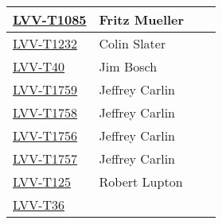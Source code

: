 \documentclass[DM,lsstdraft,STR,toc]{lsstdoc}
\begin{document}
{\begin{longtable}{p{3cm}p{3cm}p{3cm}p{6cm}}
\href{https://jira.lsstcorp.org/secure/Tests.jspa#/testCase/LVV-T1085}{LVV-T1085}
& {\small Fritz Mueller } & {\small  } &
\begin{minipage}[]{6cm}
\smallskip
{\small  }
\medskip
\end{minipage}
\\ \hline
\href{https://jira.lsstcorp.org/secure/Tests.jspa#/testCase/LVV-T1232}{LVV-T1232}
& {\small Colin Slater } & {\small  } &
\begin{minipage}[]{6cm}
\smallskip
{\small  }
\medskip
\end{minipage}
\\ \hline
\href{https://jira.lsstcorp.org/secure/Tests.jspa#/testCase/LVV-T40}{LVV-T40}
& {\small Jim Bosch } & {\small  } &
\begin{minipage}[]{6cm}
\smallskip
{\small  }
\medskip
\end{minipage}
\\ \hline
\href{https://jira.lsstcorp.org/secure/Tests.jspa#/testCase/LVV-T1759}{LVV-T1759}
& {\small Jeffrey Carlin } & {\small  } &
\begin{minipage}[]{6cm}
\smallskip
{\small  }
\medskip
\end{minipage}
\\ \hline
\href{https://jira.lsstcorp.org/secure/Tests.jspa#/testCase/LVV-T1758}{LVV-T1758}
& {\small Jeffrey Carlin } & {\small  } &
\begin{minipage}[]{6cm}
\smallskip
{\small  }
\medskip
\end{minipage}
\\ \hline
\href{https://jira.lsstcorp.org/secure/Tests.jspa#/testCase/LVV-T1756}{LVV-T1756}
& {\small Jeffrey Carlin } & {\small  } &
\begin{minipage}[]{6cm}
\smallskip
{\small  }
\medskip
\end{minipage}
\\ \hline
\href{https://jira.lsstcorp.org/secure/Tests.jspa#/testCase/LVV-T1757}{LVV-T1757}
& {\small Jeffrey Carlin } & {\small  } &
\begin{minipage}[]{6cm}
\smallskip
{\small  }
\medskip
\end{minipage}
\\ \hline
\href{https://jira.lsstcorp.org/secure/Tests.jspa#/testCase/LVV-T125}{LVV-T125}
& {\small Robert Lupton } & {\small  } &
\begin{minipage}[]{6cm}
\smallskip
{\small  }
\medskip
\end{minipage}
\\ \hline
\href{https://jira.lsstcorp.org/secure/Tests.jspa#/testCase/LVV-T36}{LVV-T36}

\end{longtable}}
\end{document}
